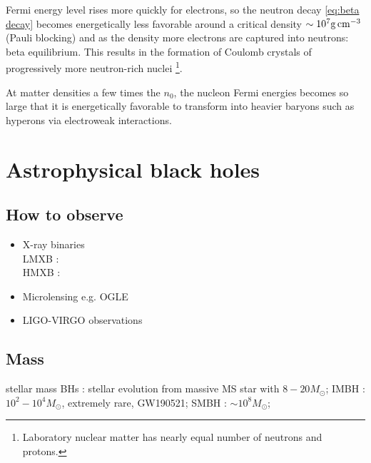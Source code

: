 \documentclass[11pt, oneside]{article}
\newcommand{\solarmass}{M_\odot}
\begin{document}
Fermi energy level rises more quickly for electrons, so the neutron decay
\eqref{eq:beta decay} becomes energetically less favorable around a critical
density $\sim 10^{7}\si[]{\gram\per\cubic\cm}$ (Pauli blocking) and as the 
density more electrons are captured into neutrons: beta equilibrium. This
results in the formation of Coulomb crystals of progressively more neutron-rich
nuclei \footnote{Laboratory nuclear matter has nearly equal number of neutrons
and protons.}.

At matter densities a few times the $n_0$, the nucleon Fermi energies becomes so
large that it is energetically favorable to transform into heavier baryons such
as hyperons via electroweak interactions.




% 
% 
\section{Astrophysical black holes}

\subsection{How to observe}

\begin{itemize}
    \item X-ray binaries \\
        LMXB : \\
        HMXB : 
    \item Microlensing e.g. OGLE
    \item LIGO-VIRGO observations
\end{itemize}

\subsection{Mass}

stellar mass BHs : stellar evolution from massive MS star with $8-20\solarmass$;
IMBH : $10^2 - 10^4 \solarmass$, extremely rare, GW190521;
SMBH : $\sim 10^8 \solarmass$;
\end{document}
